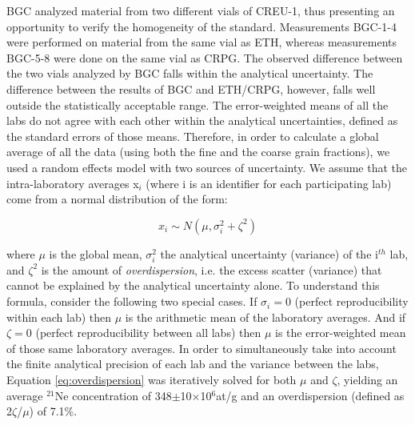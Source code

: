 \documentclass[authoryear,review,12pt]{elsarticle}
\begin{document}
BGC analyzed material from two different vials of CREU-1, thus
presenting an opportunity to verify the homogeneity of the
standard. Measurements BGC-1-4 were performed on material from the same
vial as ETH, whereas measurements BGC-5-8 were done on the same vial as
CRPG.  The observed difference between the two vials analyzed by BGC
falls within the analytical uncertainty. The difference between the
results of BGC and ETH/CRPG, however, falls well outside the
statistically acceptable range.  The error-weighted means of all the
labs do not agree with each other within the analytical uncertainties,
defined as the standard errors of those means. Therefore, in order to
calculate a global average of all the data (using both the fine and
the coarse grain fractions), we used a random effects model with two
sources of uncertainty. We assume that the intra-laboratory averages
x$_i$ (where i is an identifier for each participating lab) come from
a normal distribution of the form:

\begin{equation}
x_i \sim N(\mu,\sigma_i^2 + \zeta^2)
\label{eq:overdispersion}
\end{equation}
 
where $\mu$ is the global mean, $\sigma_i^2$ the analytical
uncertainty (variance) of the i$^{th}$ lab, and $\zeta^2$ is the
amount of {\it overdispersion}, i.e. the excess scatter (variance)
that cannot be explained by the analytical uncertainty alone.  To
understand this formula, consider the following two special cases.  If
$\sigma_i=0$ (perfect reproducibility within each lab) then $\mu$ is
the arithmetic mean of the laboratory averages.  And if $\zeta=0$
(perfect reproducibility between all labs) then $\mu$ is the
error-weighted mean of those same laboratory averages.  In order to
simultaneously take into account the finite analytical precision of
each lab and the variance between the labs, Equation
\ref{eq:overdispersion} was iteratively solved for both $\mu$ and
$\zeta$, yielding an average $^{21}$Ne concentration of
348$\pm$10$\times$10$^6$at/g and an overdispersion (defined as
2$\zeta$/$\mu$) of 7.1\%.
\end{document}
